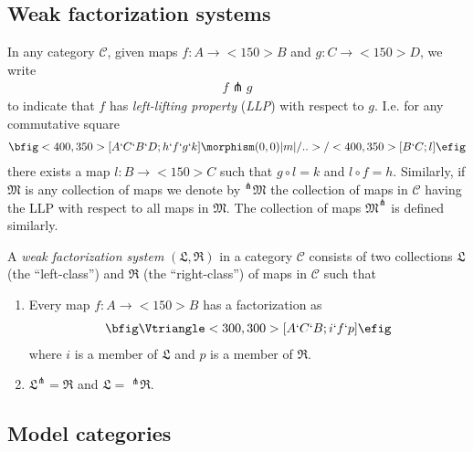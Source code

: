 \documentclass[12pt]{amsart}
\theoremstyle{definition}
\theoremstyle{remark}
\begin{document}
\subsection{Weak factorization systems}

In any category $\mathcal{C}$, given maps $f:A\to<150>B$ and $g:C\to<150>D$, we write 
\begin{align*}
  f\pitchfork g
\end{align*}
to indicate that $f$ has \emph{left-lifting property} (\emph{LLP}) with respect to
$g$.  I.e. for any commutative square
\begin{align*}
  \bfig
  \square<400,350>[A`C`B`D;h`f`g`k]
  \morphism(0,0)|m|/..>/<400,350>[B`C;l]
  \efig
\end{align*}
there exists a map $l:B\to<150>C$ such that $g\circ l=k$ and $l\circ
f=h$.  Similarly, if $\mathfrak{M}$ is any collection of maps we denote by
$^{\pitchfork}\mathfrak{M}$ the collection of maps in
$\mathcal{C}$ having the LLP with respect to all maps in $\mathfrak{M}$.
The collection of maps $\mathfrak{M}^{\pitchfork}$ is defined similarly.

A \emph{weak factorization system} $(\mathfrak{L},\mathfrak{R})$ in a category
$\mathcal{C}$ consists of two collections $\mathfrak{L}$ (the
``left-class'') and
$\mathfrak{R}$ (the ``right-class'') of maps in $\mathcal{C}$ such that 
\begin{enumerate}
\item Every map $f:A\to<150>B$ has a factorization as
  \begin{align*}
    \bfig
    \Vtriangle<300,300>[A`C`B;i`f`p]
    \efig
  \end{align*}
  where $i$ is a member of $\mathfrak{L}$ and $p$ is a member of $\mathfrak{R}$.
\item $\mathfrak{L}^{\pitchfork}=\mathfrak{R}$ and $\mathfrak{L}=\;^{\pitchfork}\mathfrak{R}$.
\end{enumerate}

\subsection{Model categories}
\end{document}
